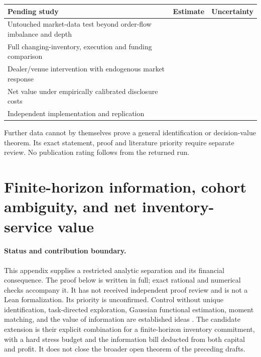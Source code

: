 \documentclass[12pt]{article}
\theoremstyle{definition}
\theoremstyle{remark}
\begin{document}
\begin{center}\small
\begin{tabular}{p{}cc}
\toprule
Pending study & Estimate & Uncertainty\\
\midrule
Untouched market-data test beyond order-flow imbalance and depth & & \\[1.8ex]
Full changing-inventory, execution and funding comparison & & \\[1.8ex]
Dealer/venue intervention with endogenous market response & & \\[1.8ex]
Net value under empirically calibrated disclosure costs & & \\[1.8ex]
Independent implementation and replication & & \\[1.8ex]
\bottomrule
\end{tabular}
\end{center}
\noindent Further data cannot by themselves prove a general identification or
decision-value theorem. Its exact statement, proof and literature priority
require separate review. No publication rating follows from the returned run.


\section*{Finite-horizon information, cohort ambiguity, and net inventory-service value}

\paragraph{Status and contribution boundary.}
This appendix supplies a restricted analytic separation and its financial
consequence. The proof below is written in full; exact rational and numerical
checks accompany it. It has not received independent proof review and is not
a Lean formalization. Its priority is unconfirmed. Control without unique
identification, task-directed exploration, Gaussian functional estimation,
moment matching, and the value of information are established ideas
\citep{fhc:waarde,fhc:wagenmaker,fhc:donoho,fhc:heinrich,fhc:blackwell}.
The candidate extension is their explicit combination for a finite-horizon
inventory commitment, with a hard stress budget and the information bill
deducted from both capital and profit. It does not close the broader open
theorem of the preceding drafts.
\end{document}
